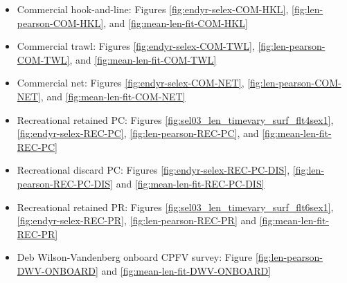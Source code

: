 \documentclass[11pt,
  english,
]{article}
\begin{document}
\begin{itemize}
\item

  Commercial hook-and-line: Figures \ref{fig:endyr-selex-COM-HKL}, \ref{fig:len-pearson-COM-HKL}, and \ref{fig:mean-len-fit-COM-HKL}

  \tagmcend\tagstructend\tagstructend
\item

  Commercial trawl: Figures \ref{fig:endyr-selex-COM-TWL}, \ref{fig:len-pearson-COM-TWL}, and \ref{fig:mean-len-fit-COM-TWL}

  \tagmcend\tagstructend\tagstructend
\item

  Commercial net: Figures \ref{fig:endyr-selex-COM-NET}, \ref{fig:len-pearson-COM-NET}, and \ref{fig:mean-len-fit-COM-NET}

  \tagmcend\tagstructend\tagstructend
\item

  Recreational retained PC: Figures \ref{fig:sel03_len_timevary_surf_flt4sex1}, \ref{fig:endyr-selex-REC-PC}, \ref{fig:len-pearson-REC-PC}, and \ref{fig:mean-len-fit-REC-PC}

  \tagmcend\tagstructend\tagstructend
\item

  Recreational discard PC: Figures \ref{fig:endyr-selex-REC-PC-DIS}, \ref{fig:len-pearson-REC-PC-DIS} and \ref{fig:mean-len-fit-REC-PC-DIS}

  \tagmcend\tagstructend\tagstructend
\item

  Recreational retained PR: Figures \ref{fig:sel03_len_timevary_surf_flt6sex1}, \ref{fig:endyr-selex-REC-PR}, \ref{fig:len-pearson-REC-PR} and \ref{fig:mean-len-fit-REC-PR}

  \tagmcend\tagstructend\tagstructend
\item

  Deb Wilson-Vandenberg onboard CPFV survey: Figure \ref{fig:len-pearson-DWV-ONBOARD} and \ref{fig:mean-len-fit-DWV-ONBOARD}


\end{itemize}
\end{document}
